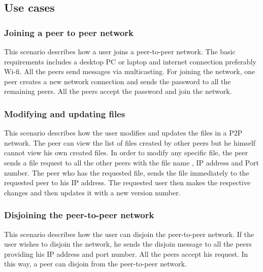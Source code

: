 
\subsection{Use cases}


	\subsubsection{Joining a peer to peer network}
	 This scenario describes how a user joins a peer-to-peer network. The basic requirements includes a desktop PC or laptop and internet connection preferably Wi-fi. All the peers send messages via multicasting. For joining the network, one peer creates a new network connection and sends the password to all the remaining peers. All the peers accept the password and join the      network. 
	\subsubsection{Modifying and updating files}
	 This scenario describes how the user modifies and updates the files in a P2P network. The peer can view the list of files created by other peers but he himself cannot view his own created files. In order to modify any specific file, the peer sends a file request to all the other peers with the file name , IP address and Port number. The peer who has the requested file, sends the file immediately to the requested peer to his IP address. The requested user then makes the respective changes and then updates it with a new version number.  
	\subsubsection{Disjoining the peer-to-peer network}
          This scenario describes how the user can disjoin the peer-to-peer network. If the user wishes to disjoin the network, he sends the disjoin message to all the peers providing his IP address and port number. All the peers accept his request. In this way, a peer can disjoin from the peer-to-peer network. 
           
           
          